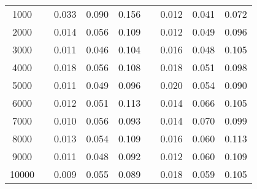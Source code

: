 % 
\begin{tabular}{ccccccccc}
  \hline
  \hline
1000 &  & 0.033 & 0.090 & 0.156 &  & 0.012 & 0.041 & 0.072 \\ 
  2000 &  & 0.014 & 0.056 & 0.109 &  & 0.012 & 0.049 & 0.096 \\ 
  3000 &  & 0.011 & 0.046 & 0.104 &  & 0.016 & 0.048 & 0.105 \\ 
  4000 &  & 0.018 & 0.056 & 0.108 &  & 0.018 & 0.051 & 0.098 \\ 
  5000 &  & 0.011 & 0.049 & 0.096 &  & 0.020 & 0.054 & 0.090 \\ 
  6000 &  & 0.012 & 0.051 & 0.113 &  & 0.014 & 0.066 & 0.105 \\ 
  7000 &  & 0.010 & 0.056 & 0.093 &  & 0.014 & 0.070 & 0.099 \\ 
  8000 &  & 0.013 & 0.054 & 0.109 &  & 0.016 & 0.060 & 0.113 \\ 
  9000 &  & 0.011 & 0.048 & 0.092 &  & 0.012 & 0.060 & 0.109 \\ 
  10000 &  & 0.009 & 0.055 & 0.089 &  & 0.018 & 0.059 & 0.105 \\ 
   \hline
\end{tabular}
